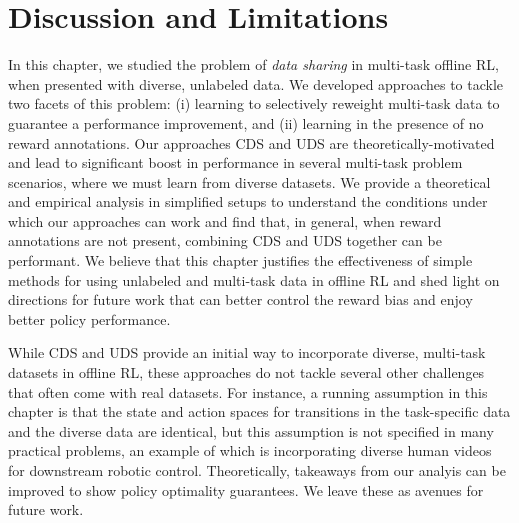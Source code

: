 \documentclass[../thesis.tex]{subfiles}
\begin{document}
    


% 




    
\section{Discussion and Limitations}

In this chapter, we studied the problem of \emph{data sharing} in multi-task offline RL, when presented with diverse, unlabeled data. We developed approaches to tackle two facets of this problem: (i) learning to selectively reweight multi-task data to guarantee a performance improvement, and (ii) learning in the presence of no reward annotations. Our approaches CDS and UDS are theoretically-motivated and lead to significant boost in performance in several multi-task problem scenarios, where we must learn from diverse datasets. We provide a theoretical and empirical analysis in simplified setups to understand the conditions under which our approaches can work and find that, in general, when reward annotations are not present, combining CDS and UDS together can be performant. We believe that this chapter justifies the effectiveness of simple methods for using unlabeled and multi-task data in offline RL and shed light on directions for future work that can better control the reward bias and enjoy better policy performance.    

While CDS and UDS provide an initial way to incorporate diverse, multi-task datasets in offline RL, these approaches do not tackle several other challenges that often come with real datasets. For instance, a running assumption in this chapter is that the state and action spaces for transitions in the task-specific data and the diverse data are identical, but this assumption is not specified in many practical problems, an example of which is incorporating diverse human videos for downstream robotic control. Theoretically, takeaways from our analyis can be improved to show policy optimality guarantees. We leave these as avenues for future work.       

    
\end{document}
